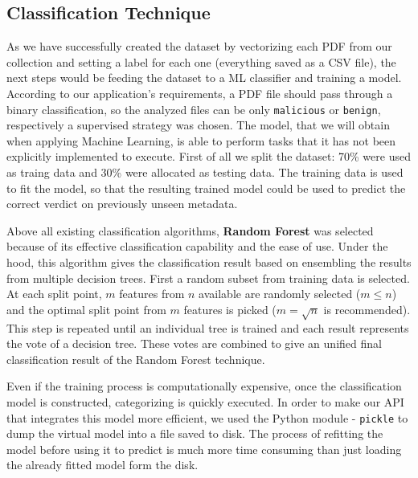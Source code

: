 \subsection{Classification Technique}
As we have successfully created the dataset by vectorizing each PDF from our collection and setting a label for each one (everything saved as a CSV file), the next steps would be feeding the dataset to a ML classifier and training a model. According to our application's requirements, a PDF file should pass through a binary classification, so the analyzed files can be only \texttt{malicious} or \texttt{benign}, respectively a supervised strategy was chosen. The model, that we will obtain when applying Machine Learning, is able to perform tasks that it has not been explicitly implemented to execute. First of all we split the dataset: 70\% were used as traing data and 30\% were allocated as testing data. The training data is used to fit the model, so that the resulting trained model could be used to predict the correct verdict on previously unseen metadata. \par 
Above all existing classification algorithms, \textbf{Random Forest} was selected because of its effective classification capability and the ease of use. Under the hood, this algorithm gives the classification result based on ensembling the results from multiple decision trees. First a random subset from training data is selected. At each split point, $m$ features from $n$ available are randomly selected ($m \leqslant n$) and the optimal split point from $m$ features is picked ($m = \sqrt{n}$ is recommended). This step is repeated until an individual tree is trained and each result represents the vote of a decision tree. These votes are combined to give an unified final classification result of the Random Forest technique. \par
Even if the training process is computationally expensive, once the classification model is constructed, categorizing is quickly executed. In order to make our API that integrates this model more efficient, we used the Python module - \texttt{pickle} to dump the virtual model into a file saved to disk. The process of refitting the model before using it to predict is much more time consuming than just loading the already fitted model form the disk.


